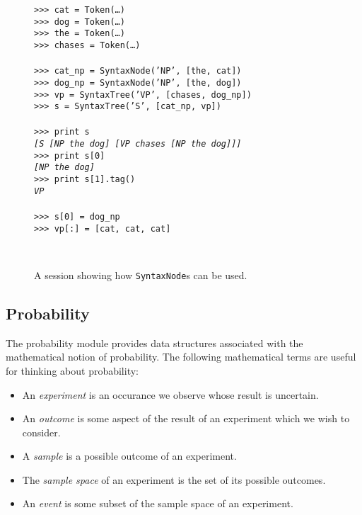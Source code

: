 \documentclass{article}
\begin{document}
\begin{figure}
\noindent
\begin{centering}
\begin{boxedminipage}{\textwidth}
\begin{tabbing}
\texttt{>>> cat = Token(\ldots)}\\
\texttt{>>> dog = Token(\ldots)}\\
\texttt{>>> the = Token(\ldots)}\\
\texttt{>>> chases = Token(\ldots)}\\
\\
\texttt{>>> cat\_np = SyntaxNode('NP', [the, cat])}\\
\texttt{>>> dog\_np = SyntaxNode('NP', [the, dog])}\\
\texttt{>>> vp = SyntaxTree('VP', [chases, dog\_np])}\\
\texttt{>>> s = SyntaxTree('S', [cat\_np, vp])}\\
\\
\texttt{>>> print s}\\
\texttt{\textit{[S [NP the dog] [VP chases [NP the dog]]]}}\\
\texttt{>>> print s[0]}\\
\texttt{\textit{[NP the dog]}}\\
\texttt{>>> print s[1].tag()}\\
\texttt{\textit{VP}}\\
\\
\texttt{>>> s[0] = dog\_np}\\
\texttt{>>> vp[:] = [cat, cat, cat]}\\
\end{tabbing}
\end{boxedminipage}\\
\end{centering}
 \caption[Example \texttt{SyntaxNode} use]
 {A session showing how \texttt{SyntaxNode}s can be used.}
\label{fig:syntaxnode}
\end{figure}

\subsection{Probability}

The probability module provides data structures associated with the
mathematical notion of probability.  The following mathematical terms
are useful for thinking about probability:

\begin{itemize}
  \item An \emph{experiment} is an occurance we observe whose result 
        is uncertain.
  \item An \emph{outcome} is some aspect of the result of an
        experiment which we wish to consider.
  \item A \emph{sample} is a possible outcome of an experiment.
  \item The \emph{sample space} of an experiment is the set of its
        possible outcomes.
  \item An \emph{event} is some subset of the sample space of an
        experiment. 
\end{itemize}
\end{document}
